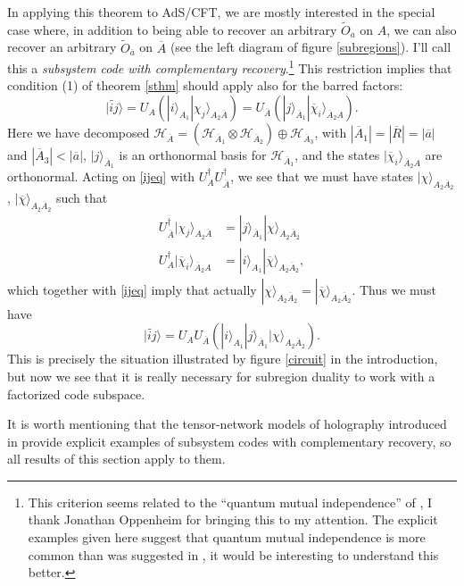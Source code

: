 \documentclass[12pt]{article}
\newcommand{\be}{\begin{equation}}
\newcommand{\ee}{\end{equation}}
\newcommand{\ran}{\rangle}
\newcommand{\wt}{\widetilde}
\newcommand{\Hh}{\mathcal{H}}
\newcommand{\HAb}{\mathcal{H}_{\ol{A}}}
\newcommand{\Ab}{\ol{A}}
\newcommand{\ab}{\ol{a}}
\newcommand{\ol}{\overline}
\begin{document}
In applying this theorem to AdS/CFT, we are mostly interested in the special case where, in addition to being able to recover an arbitrary $\wt{O}_a$ on $A$, we can also recover an arbitrary $\wt{O}_{\ab}$ on $\Ab$ (see the left diagram of figure \ref{subregions}).  I'll call this a \textit{subsystem code with complementary recovery}.\footnote{This criterion seems related to the ``quantum mutual independence'' of \cite{horodecki2009quantum}, I thank Jonathan Oppenheim for bringing this to my attention.  The explicit examples given here suggest that quantum mutual independence is more common than was suggested in \cite{horodecki2009quantum}, it would be interesting to understand this better.}  This restriction implies that condition (1) of theorem \ref{sthm} should apply also for the barred factors:
\be\label{ijeq}
|\wt{ij}\ran=U_A\left(|i\ran_{A_1}|\chi_j\ran_{A_2 \Ab}\right)=U_{\Ab}\left(|j\ran_{\Ab_1}|\ol{\chi}_i\ran_{\Ab_2 A}\right).
\ee
Here we have decomposed $\HAb=\left(\Hh_{\Ab_1}\otimes\Hh_{\Ab_2}\right)\oplus \Hh_{\Ab_3}$, with $|\Ab_1|=|\ol{R}|=|\ab|$ and $|\Ab_3|<|\ab|$, $|j\ran_{\Ab_1}$ is an orthonormal basis for $\Hh_{\Ab_1}$, and the states $|\ol{\chi}_i\ran_{\Ab_2 A}$ are orthonormal.  Acting on \eqref{ijeq} with $U_A^\dagger U_{\Ab}^\dagger$, we see that we must have states $|\chi\ran_{A_2\Ab_2}$, $|\ol{\chi}\ran_{A_2\Ab_2}$ such that
\begin{align}\nonumber
U_{\Ab}^\dagger|\chi_j\ran_{A_2 \Ab}&=|j\ran_{\Ab_1}|\chi\ran_{A_2\Ab_2}\\
U_A^\dagger|\ol{\chi}_i\ran_{\Ab_2 A}&=|i\ran_{A_1}|\ol{\chi}\ran_{A_2\Ab_2},
\end{align}
which together with \eqref{ijeq} imply that actually $|\chi\ran_{A_2\Ab_2}=|\ol{\chi}\ran_{A_2\Ab_2}$.  Thus we must have
\be\label{sstate}
|\wt{ij}\ran=U_A U_{\Ab}\left(|i\ran_{A_1}|j\ran_{\Ab_1}|\chi\ran_{A_2\Ab_2}\right).
\ee
This is precisely the situation illustrated by figure \ref{circuit} in the introduction, but now we see that it is really necessary for subregion duality to work with a factorized code subspace.

It is worth mentioning that the tensor-network models of holography introduced in \cite{Pastawski:2015qua,Hayden:2016cfa} provide explicit examples of subsystem codes with complementary recovery, so all results of this section apply to them. 
\end{document}
